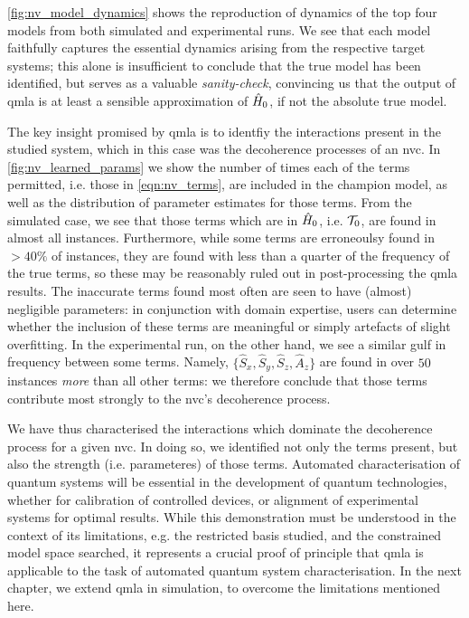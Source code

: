 \cref{fig:nv_model_dynamics} shows the reproduction of dynamics of the top four models
    from both simulated and experimental \glspl{run}. 
We see that each model faithfully captures the essential dynamics arising from the respective target systems;
    this alone is insufficient to conclude that the \gls{true model} has been identified, 
    but serves as a valuable \emph{sanity-check}, convincing us that the output of \gls{qmla} is at least a sensible 
    approximation of $\hat{H}_0$, if not the absolute \gls{true model}.
\par 




The key insight promised by \gls{qmla} is to identfiy the interactions present in the studied system, 
    which in this case was the decoherence processes of an \gls{nvc}.
In \cref{fig:nv_learned_params} we show the number of times each of the terms permitted, i.e. those in \cref{eqn:nv_terms},
    are included in the \gls{champion model},
    as well as the distribution of parameter estimates for those terms. 
From the simulated case, we see that those terms which are in $\hat{H}_0$, i.e. $\mathcal{T}_0$, are found in almost all instances.
Furthermore, while some terms are erroneoulsy found in $>40\%$ of instances, 
    they are found with less than a quarter of the frequency of the true terms,
    so these may be reasonably ruled out in post-processing the \gls{qmla} results. 
The inaccurate terms found most often are seen to have (almost) negligible parameters:
    in conjunction with domain expertise, users can determine whether the inclusion of these terms 
    are meaningful or simply artefacts of slight overfitting.
In the experimental \gls{run}, on the other hand, we see a similar gulf in frequency between some terms.
Namely, $\{ \hat{S}_x, \hat{S}_y, \hat{S}_z, \hat{A}_z \}$ are found in over $50$ \glspl{instance} \emph{more} than all other terms:
    we therefore conclude that those terms contribute most strongly to the \gls{nvc}'s decoherence process.
\par 

We have thus characterised the interactions which dominate the decoherence process for a given \gls{nvc}. 
In doing so, we identified not only the terms present, but also the strength (i.e. parameteres) of those terms. 
Automated characterisation of quantum systems will be essential in the development of quantum technologies, 
    whether for calibration of controlled devices, or alignment of experimental systems for optimal results. 
While this demonstration must be understood in the context of its limitations, 
    e.g. the restricted basis studied, and the constrained model space searched, 
    it represents a crucial proof of principle that \gls{qmla} is applicable to the task 
    of automated quantum system characterisation. 
In the next chapter, we extend \gls{qmla} in simulation, to overcome the limitations mentioned here. 

